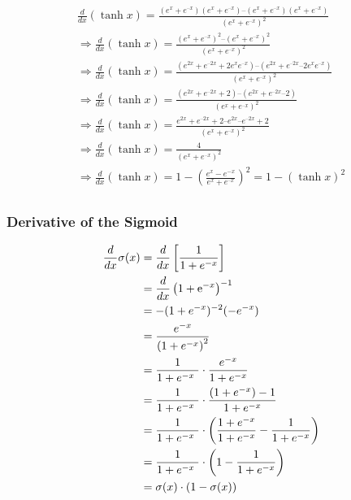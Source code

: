 \documentclass[11pt]{article}
\begin{document}
\begin{equation}
\begin{gathered} \frac{d}{{dx}}\left( {\tanh x} \right) = \frac{{\left( {{e^x} + {e^{ – x}}} \right)\left( {{e^x} + {e^{ – x}}} \right) – \left( {{e^x} + {e^{ – x}}} \right)\left( {{e^x} + {e^{ – x}}} \right)}}{{{{\left( {{e^x} + {e^{ – x}}} \right)}^2}}} \\ \Rightarrow \frac{d}{{dx}}\left( {\tanh x} \right) = \frac{{{{\left( {{e^x} + {e^{ – x}}} \right)}^2} – {{\left( {{e^x} + {e^{ – x}}} \right)}^2}}}{{{{\left( {{e^x} + {e^{ – x}}} \right)}^2}}} \\ \Rightarrow \frac{d}{{dx}}\left( {\tanh x} \right) = \frac{{\left( {{e^{2x}} + {e^{ – 2x}} + 2{e^x}{e^{ – x}}} \right) – \left( {{e^{2x}} + {e^{ – 2x}} – 2{e^x}{e^{ – x}}} \right)}}{{{{\left( {{e^x} + {e^{ – x}}} \right)}^2}}} \\ \Rightarrow \frac{d}{{dx}}\left( {\tanh x} \right) = \frac{{\left( {{e^{2x}} + {e^{ – 2x}} + 2} \right) – \left( {{e^{2x}} + {e^{ – 2x}} – 2} \right)}}{{{{\left( {{e^x} + {e^{ – x}}} \right)}^2}}} \\ \Rightarrow \frac{d}{{dx}}\left( {\tanh x} \right) = \frac{{{e^{2x}} + {e^{ – 2x}} + 2 – {e^{2x}} – {e^{ – 2x}} + 2}}{{{{\left( {{e^x} + {e^{ – x}}} \right)}^2}}} \\ \Rightarrow \frac{d}{{dx}}\left( {\tanh x} \right) = \frac{4}{{{{\left( {{e^x} + {e^{ – x}}} \right)}^2}}} \\ \Rightarrow \frac{d}{{dx}}\left( {\tanh x} \right) = 1 - {\left( {\frac{e^x - e^{-x}}{{{e^x} + {e^{ – x}}}}} \right)^2} = 1 - {\left(\tanh x \right)}^2 \\ \end{gathered}
\end{equation}

\hypertarget{derivative-of-the-sigmoid}{%
\subsubsection{Derivative of the
Sigmoid}\label{derivative-of-the-sigmoid}}

\begin{align*}
\dfrac{d}{dx} \sigma(x) &= \dfrac{d}{dx} \left[ \dfrac{1}{1 + e^{-x}} \right] \notag \\
&= \dfrac{d}{dx} \left( 1 + \mathrm{e}^{-x} \right)^{-1} \notag\\
&= -(1 + e^{-x})^{-2}(-e^{-x}) \notag\\
&= \dfrac{e^{-x}}{\left(1 + e^{-x}\right)^2} \notag\\
&= \dfrac{1}{1 + e^{-x}\ } \cdot \dfrac{e^{-x}}{1 + e^{-x}}  \notag\\
&= \dfrac{1}{1 + e^{-x}\ } \cdot \dfrac{(1 + e^{-x}) - 1}{1 + e^{-x}}  \notag\\
&= \dfrac{1}{1 + e^{-x}\ } \cdot \left( \dfrac{1 + e^{-x}}{1 + e^{-x}} - \dfrac{1}{1 + e^{-x}} \right) \notag\\
&= \dfrac{1}{1 + e^{-x}\ } \cdot \left( 1 - \dfrac{1}{1 + e^{-x}} \right) \notag\\
&= \sigma(x) \cdot (1 - \sigma(x))
\end{align*}
\end{document}
